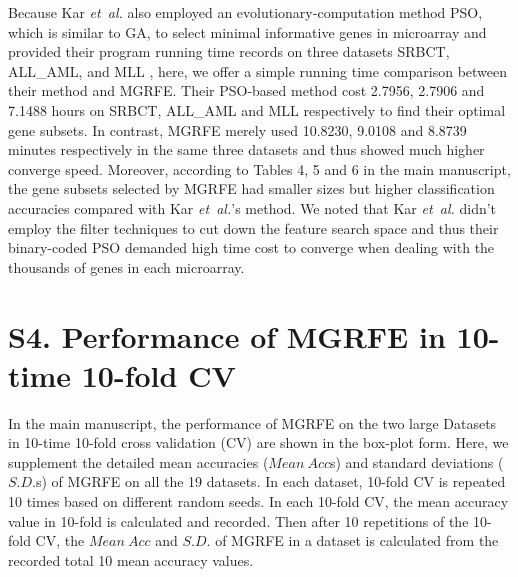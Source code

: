 \documentclass[10pt,journal,compsoc]{IEEEtran}
\begin{document}
	Because Kar \emph{et~al.} also employed an evolutionary-computation method PSO, which is similar to GA, to select minimal informative genes in microarray and provided their program running time records on three datasets SRBCT, ALL\_AML, and MLL \cite{W15}, here, we offer a simple running time comparison between their method and MGRFE. Their PSO-based method cost 2.7956, 2.7906 and 7.1488 hours on SRBCT, ALL\_AML and MLL respectively to find their optimal gene subsets. In contrast, MGRFE merely used 10.8230, 9.0108 and 8.8739 minutes respectively in the same three datasets and thus showed much higher converge speed. Moreover, according to Tables 4, 5 and 6 in the main manuscript, the gene subsets selected by MGRFE had smaller sizes but higher classification accuracies compared with Kar \emph{et~al.}'s method. We noted that Kar \emph{et~al.} didn't employ the filter techniques to cut down the feature search space and  thus their binary-coded PSO demanded high time cost to converge when dealing with the thousands of genes in each microarray.


	\section*{S4. Performance of MGRFE in 10-time 10-fold CV}

	In the main manuscript, the performance of MGRFE on the two large Datasets in 10-time 10-fold cross validation (CV) are shown in the box-plot form. Here, we supplement the detailed mean accuracies ($Mean~Acc$s) and standard deviations ($S.D.$s) of MGRFE on all the 19 datasets. In each dataset, 10-fold CV is repeated 10 times based on different random seeds. In each 10-fold CV, the mean accuracy value in 10-fold is calculated and recorded. Then after 10 repetitions of the 10-fold CV, the $Mean~Acc$ and $S.D.$ of MGRFE in a dataset is calculated from the recorded total 10 mean accuracy values.
	
\end{document}
